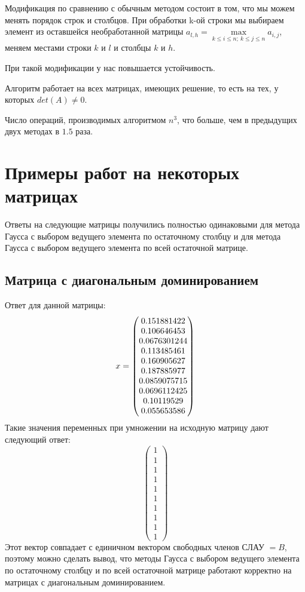 \documentclass[../../report.tex]{subfiles}
\begin{document}
Модификация по сравнению с обычным методом состоит в том, что мы можем менять порядок строк и столбцов. При обработки {k}-ой строки мы выбираем элемент из оставшейся необработанной матрицы $a_{l,h}= \max \limits_{k \le i \le n;~k \le j \le n} a_{i,j}$, меняем местами строки $k$ и $l$ и столбцы $k$ и $h$.

При такой модификации у нас повышается устойчивость.

Алгоритм работает на всех матрицах, имеющих решение, то есть на тех, у которых $det(A) \neq 0$.

Число операций, производимых алгоритмом $n^3$, что больше, чем в предыдущих двух методах в $1.5$ раза.

\section{Примеры работ на некоторых матрицах}
Ответы на следующие матрицы получились полностью одинаковыми для метода Гаусса с выбором ведущего элемента по остаточному столбцу и для метода Гаусса с выбором ведущего элемента по всей остаточной матрице.

\subsection{Матрица с диагональным доминированием}
Ответ для данной матрицы:
\[
x = \begin{pmatrix} 0.151881422 \\ 0.106646453 \\ 0.0676301244 \\ 0.113485461 \\ 0.160905627 \\ 0.187885977 \\ 0.0859075715 \\ 0.0696112425 \\ 0.10119529 \\ 0.055653586 \end{pmatrix}
\]
Такие значения переменных при умножении на исходную матрицу дают следующий ответ:
\[
\begin{pmatrix}
1 \\
1 \\
1 \\
1 \\
1 \\
1 \\
1 \\
1 \\
1 \\
1
\end{pmatrix}
\]
Этот вектор совпадает с единичном вектором свободных членов СЛАУ $= B$, поэтому можно сделать вывод, что методы Гаусса с выбором ведущего элемента по остаточному столбцу и по всей остаточной матрице работают корректно на матрицах с диагональным доминированием.
\end{document}
